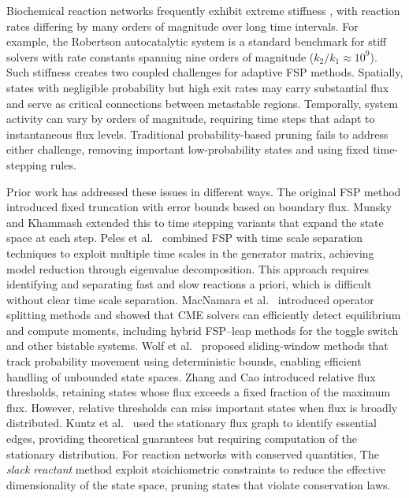 \documentclass[review,onefignum,onetabnum]{siamart171218}
\begin{document}
Biochemical reaction networks frequently exhibit extreme stiffness \cite{zhang_cao}, with reaction rates differing by many orders of magnitude over long time intervals. For example, the Robertson autocatalytic system \cite{Robertson1967} is a standard benchmark for stiff solvers with rate constants spanning nine orders of magnitude ($k_2/k_1 \approx 10^9$). Such stiffness creates two coupled challenges for adaptive FSP methods. Spatially, states with negligible probability but high exit rates may carry substantial flux and serve as critical connections between metastable regions. Temporally, system activity can vary by orders of magnitude, requiring time steps that adapt to instantaneous flux levels. Traditional probability-based pruning fails to address either challenge, removing important low-probability states and using fixed time-stepping rules.

Prior work has addressed these issues in different ways. The original FSP method \cite{Munsky2006} introduced fixed truncation with error bounds based on boundary flux. Munsky and Khammash \cite{MUNSKY2007818} extended this to time stepping variants that expand the state space at each step. Peles et al.~\cite{peles} combined FSP with time scale separation techniques to exploit multiple time scales in the generator matrix, achieving model reduction through eigenvalue decomposition. This approach requires identifying and separating fast and slow reactions a priori, which is difficult without clear time scale separation. MacNamara et al.~\cite{shev} introduced operator splitting methods and showed that CME solvers can efficiently detect equilibrium and compute moments, including hybrid FSP–leap methods for the toggle switch and other bistable systems. Wolf et al.~\cite{Wolf2010} proposed sliding-window methods that track probability movement using deterministic bounds, enabling efficient handling of unbounded state spaces. Zhang and Cao \cite{zhang_cao} introduced relative flux thresholds, retaining states whose flux exceeds a fixed fraction of the maximum flux. However, relative thresholds can miss important states when flux is broadly distributed. Kuntz et al.~\cite{kuntz2010} used the stationary flux graph to identify essential edges, providing theoretical guarantees but requiring computation of the stationary distribution. For reaction networks with conserved quantities, The \textit{slack reactant} method \cite{slack} exploit stoichiometric constraints to reduce the effective dimensionality of the state space, pruning states that violate conservation laws.
\end{document}
